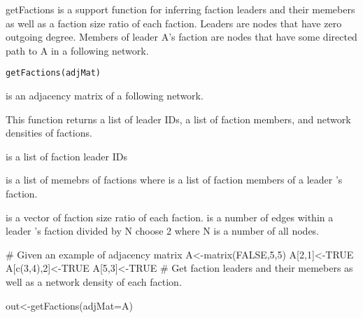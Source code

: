 \documentclass[a4paper]{book}
\begin{document}
%
\begin{Description}\relax
getFactions is a support function for inferring faction leaders and their memebers as well as a faction size ratio of each faction.
Leaders are nodes that have zero outgoing degree. Members of leader A's faction are nodes that have some directed path to A in a following network.
\end{Description}
%
\begin{Usage}
\begin{verbatim}
getFactions(adjMat)
\end{verbatim}
\end{Usage}
%
\begin{Arguments}
\begin{ldescription}
\item[\code{adjMat}] is an adjacency matrix of a following network.
\end{ldescription}
\end{Arguments}
%
\begin{Value}
This function returns a list of leader IDs, a list of faction members, and network densities of factions.

\begin{ldescription}
\item[\code{leaders}]  is a list of faction leader IDs  
\item[\code{factionMembers}]  is a list of memebrs of factions where  is a list of faction members of a leader 's faction. 
\item[\code{factionSizeRatio}]  is a vector of faction size ratio of each faction.
 is a number of edges within a leader 's faction divided by N choose 2 where N is a number of all nodes.
\end{ldescription}
\end{Value}
%
\begin{Examples}
\begin{ExampleCode}
# Given an example of adjacency matrix
A<-matrix(FALSE,5,5)
A[2,1]<-TRUE
A[c(3,4),2]<-TRUE
A[5,3]<-TRUE
# Get faction leaders and their memebers as well as a network density of each faction.

out<-getFactions(adjMat=A)

\end{ExampleCode}
\end{Examples}
\end{document}
